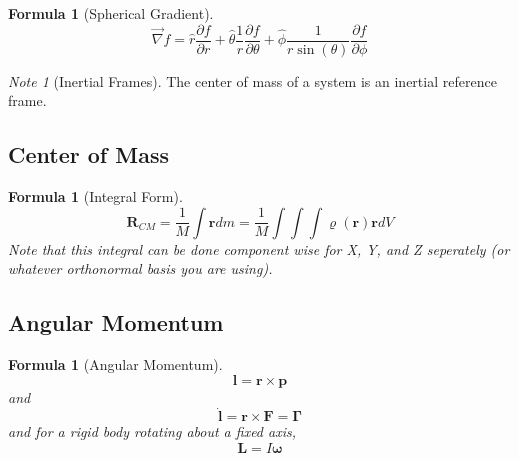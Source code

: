 \documentclass[12pt]{article}
\newtheorem{for}[thm]{Formula}
\theoremstyle{definition}
\theoremstyle{remark}
\newtheorem*{note}{Note} %
\numberwithin{equation}{section}
\newcommand\B[1]{\textbf{#1}}
\begin{document}
\vspace{15pt}

\begin{for}[Spherical Gradient]
         \begin{equation}
                \vec{\nabla}f = \hat{r}\frac{\partial f}{\partial r} + \hat{\theta}\frac{1}{r}\frac{\partial f}{\partial \theta} + \hat{\phi}\frac{1}{r\sin(\theta)}\frac{\partial f}{\partial \phi}
        \end{equation}
\end{for}


\vspace{15pt}


\begin{note}[Inertial Frames]
        The center of mass of a system is an inertial reference frame.
\end{note}
\vspace{15pt}



\subsection{Center of Mass}


\begin{for}[Integral Form]
        \begin{equation}
                \B{R}_{CM} = \frac{1}{M}\int\B{r}dm = \frac{1}{M}\int\int\int\boldsymbol{\varrho(r)}\B{r}dV
        \end{equation}
        Note that this integral can be done component wise for X, Y, and Z seperately (or whatever orthonormal basis you are using).
\end{for}

\vspace{15pt}

\subsection{Angular Momentum}


\begin{for}[Angular Momentum]
        \begin{equation}
                \B{l} = \B{r} \times \B{p}
        \end{equation}
        and \begin{equation}
                \dot{\B{l}} = \B{r} \times \B{F} = \boldsymbol{\Gamma}
        \end{equation}
        and for a rigid body rotating about a fixed axis, \begin{equation}
                \B{L} = I\boldsymbol{\omega}
        \end{equation}
\end{for}
\end{document}
